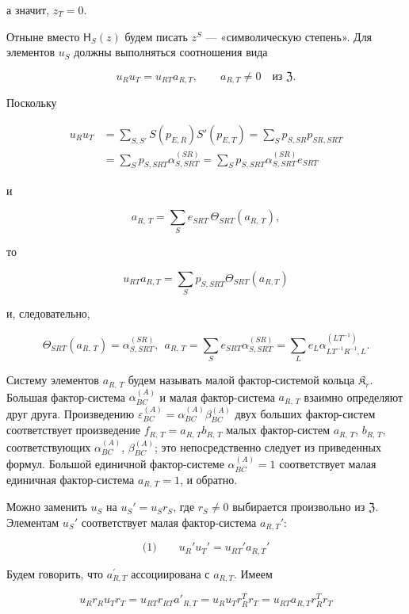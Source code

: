 \documentclass[11pt]{article}
\begin{document}
а значит, \(z_T=0\).

Отныне вместо \(\mathsf{H}_S(z)\) будем писать \(z^S\) --- «символическую степень». Для элементов \(u_S\) должны выполняться соотношения вида

\[
u_Ru_T=u_{RT}a_{R,T},\qquad a_{R,T}\ne0\quad\text{из }\mathfrak Z.
\]

Поскольку

\[
\begin{aligned}
u_Ru_T
&=\sum_{S,S'} S(p_{E,R})S'(p_{E,T})
=\sum_S p_{S,SR}p_{SR,SRT}\\
&=\sum_S p_{S,SRT}\alpha_{S,SRT}^{(SR)}
=\sum_S p_{S,SRT}\alpha_{S,SRT}^{(SR)}e_{SRT}
\end{aligned}
\]

и

\[a_{R,\,T} = \sum\limits_{S} e_{SRT}\, \Theta_{SRT} \left(a_{R,\,T}\right),\]

то

\[u_{RT} a_{R,T} = \sum\limits_{S} p_{S,SRT} \Theta_{SRT} (a_{R,T})\]

и, следовательно,

\[\Theta_{SRT}(a_{R,\,T}) = \alpha_{S,SRT}^{(SR)}, ~~ a_{R,\,T} = \sum\limits_{S} e_{SRT} \alpha_{S,SRT}^{(SR)} = \sum\limits_{L} e_{L} \alpha_{LT^{-1}R^{-1},L}^{(LT^{-1})}.\]

Систему элементов \(a_{R,\,T}\) будем называть малой фактор-системой кольца \(\mathfrak K_r\). Большая фактор-система \(\alpha_{BC}^{(A)}\) и малая фактор-система \(a_{R,\,T}\) взаимно определяют друг друга. Произведению \(\varepsilon_{BC}^{(A)} = \alpha_{BC}^{(A)} \beta_{BC}^{(A)}\) двух больших фактор-систем соответствует произведение \(f_{R,\,T} = a_{R,\,T}b_{R,\,T}\) малых фактор-систем \(a_{R,\,T}\), \(b_{R,\,T}\), соответствующих \(\alpha_{BC}^{(A)}\), \(\beta_{BC}^{(A)}\); это непосредственно следует из приведенных формул. Большой единичной фактор-системе \(\alpha_{BC}^{(A)} = 1\) соответствует малая единичная фактор-система \(a_{R,\,T} = 1\), и обратно.

Можно заменить \(u_S\) на \(u_S'=u_Sr_S\), где \(r_S\neq 0\) выбирается произвольно из \(\mathfrak Z\). Элементам \(u_S'\) соответствует малая фактор-система \(a_{R,T}'\):

\[
\text{(1)}\qquad u_R'u_T'=u_{RT}'a_{R,T}'
\]

Будем говорить, что \(a_{R,T}^{\prime}\) ассоциирована с \(a_{R,T}\). Имеем

\[u_R r_R u_T r_T = u_{RT} r_{RT} a'_{R,T} = u_R u_T r_R^T r_T = u_{RT} a_{R,T} r_R^T r_T\]
\end{document}

